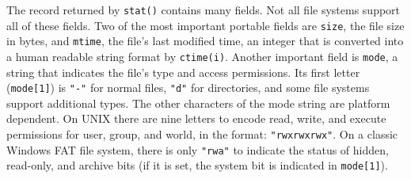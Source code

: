 
The record returned by \texttt{stat()} contains many fields. Not all file
systems support all of these fields. Two of the most important portable fields
are \texttt{size}, the file size in bytes, and \texttt{mtime},
the file's last modified time, an integer that is
converted into a human readable string format by \texttt{ctime(i)}. Another
important field is \texttt{mode}, a string that indicates the file's type and
access permissions. Its first letter (\texttt{mode[1]}) is
\texttt{"-"} for normal files, \texttt{"d"} for directories, and some file
systems support additional types. The other characters of the mode string are
platform dependent. On UNIX there are nine letters to encode read, write, and
execute permissions for user, group, and world, in the format:
\texttt{"rwxrwxrwx"}. On a classic Windows FAT file system, there is only
\texttt{"rwa"} to indicate the status of hidden, read-only, and archive bits (if
it is set, the system bit is indicated in \texttt{mode[1]}).

